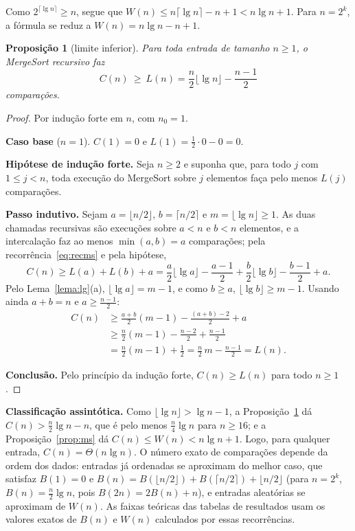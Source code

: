 \documentclass[11pt,a4paper]{article}
\newtheorem{proposicao}{Proposição}
\begin{document}
Como $2^{\lceil\lg n\rceil}\ge n$, segue que $W(n)\le n\lceil\lg n\rceil-n+1<n\lg n+1$. Para $n=2^k$, a fórmula se reduz a $W(n)=n\lg n-n+1$.

\begin{proposicao}[limite inferior]
\label{prop:msinf}
Para toda entrada de tamanho $n\ge1$, o MergeSort recursivo faz
\[
C(n)\ \ge\ L(n)=\frac n2\lfloor\lg n\rfloor-\frac{n-1}{2}
\]
comparações.
\end{proposicao}

\begin{proof}
Por indução forte em $n$, com $n_0=1$.

\textbf{Caso base} ($n=1$). $C(1)=0$ e $L(1)=\frac12\cdot0-0=0$.

\textbf{Hipótese de indução forte.} Seja $n\ge2$ e suponha que, para todo $j$ com $1\le j<n$, toda execução do MergeSort sobre $j$ elementos faça pelo menos $L(j)$ comparações.

\textbf{Passo indutivo.} Sejam $a=\lfloor n/2\rfloor$, $b=\lceil n/2\rceil$ e $m=\lfloor\lg n\rfloor\ge1$. As duas chamadas recursivas são execuções sobre $a<n$ e $b<n$ elementos, e a intercalação faz ao menos $\min(a,b)=a$ comparações; pela recorrência~\eqref{eq:recms} e pela hipótese,
\[
C(n)\ge L(a)+L(b)+a=\frac a2\lfloor\lg a\rfloor-\frac{a-1}{2}+\frac b2\lfloor\lg b\rfloor-\frac{b-1}{2}+a.
\]
Pelo Lema~\ref{lema:lg}(a), $\lfloor\lg a\rfloor=m-1$, e como $b\ge a$, $\lfloor\lg b\rfloor\ge m-1$. Usando ainda $a+b=n$ e $a\ge\frac{n-1}{2}$:
\begin{align*}
C(n)&\ge\frac{a+b}{2}(m-1)-\frac{(a+b)-2}{2}+a\\
&\ge\frac n2(m-1)-\frac{n-2}{2}+\frac{n-1}{2}\\
&=\frac n2(m-1)+\frac12=\frac n2\,m-\frac{n-1}{2}=L(n).
\end{align*}

\textbf{Conclusão.} Pelo princípio da indução forte, $C(n)\ge L(n)$ para todo $n\ge1$.
\end{proof}

\textbf{Classificação assintótica.} Como $\lfloor\lg n\rfloor>\lg n-1$, a Proposição~\ref{prop:msinf} dá $C(n)>\frac n2\lg n-n$, que é pelo menos $\frac n4\lg n$ para $n\ge16$; e a Proposição~\ref{prop:ms} dá $C(n)\le W(n)<n\lg n+1$. Logo, para qualquer entrada, $C(n)=\Theta(n\lg n)$. O número exato de comparações depende da ordem dos dados: entradas já ordenadas se aproximam do melhor caso, que satisfaz $B(1)=0$ e $B(n)=B(\lfloor n/2\rfloor)+B(\lceil n/2\rceil)+\lfloor n/2\rfloor$ (para $n=2^k$, $B(n)=\frac n2\lg n$, pois $B(2n)=2B(n)+n$), e entradas aleatórias se aproximam de $W(n)$. As faixas teóricas das tabelas de resultados usam os valores exatos de $B(n)$ e $W(n)$ calculados por essas recorrências.
\end{document}
